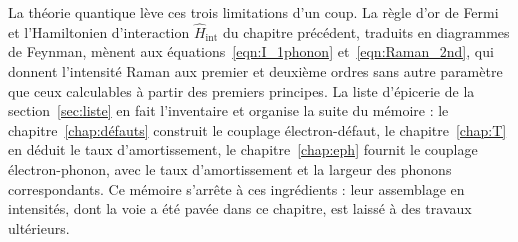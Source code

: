La théorie quantique lève ces trois limitations d'un coup. La règle d'or de Fermi et l'Hamiltonien d'interaction $\hat{H}_\text{int}$
du chapitre précédent, traduits en diagrammes de Feynman, mènent aux équations~\eqref{eqn:I_1phonon} et~\eqref{eqn:Raman_2nd}, qui donnent l'intensité Raman aux premier et deuxième ordres sans autre paramètre que ceux calculables à partir des premiers principes. La liste d'épicerie de la section~\ref{sec:liste} en fait l'inventaire et organise la suite du mémoire : le chapitre~\ref{chap:défauts} construit le couplage électron-défaut, le chapitre~\ref{chap:T} en déduit le taux d'amortissement, le chapitre~\ref{chap:eph} fournit le couplage électron-phonon, avec le taux d'amortissement et la largeur des phonons correspondants. Ce mémoire s'arrête à ces ingrédients : leur assemblage en intensités, dont la voie a été pavée dans ce chapitre, est laissé à des travaux ultérieurs.


